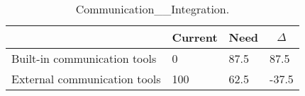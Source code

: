 
  \begin{table*}[]
  \centering
  \notsotiny
  \caption{ Communication__Integration.}
\label{tab:communication__integration}
\begin{tabular}{|l|l|l|l|}
  \hline
  \rowcolor[HTML]{C0C0C0}
    \multicolumn{1}{|c|}{Feature} & \multicolumn{1}{c|}{Current} & \multicolumn{1}{c|}{Need} & \multicolumn{1}{c|}{$\Delta$} \\ \hline
  Built-in communication tools & 0 & 87.5 & 87.5 \\ \hline 
External communication tools & 100 & 62.5 & -37.5 \\ \hline 
\end{tabular}%
  \end{table*}
